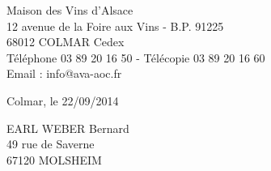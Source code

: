\documentclass[a4paper, 10pt]{letter}
\begin{document}
	\begin{minipage}{0.5\textwidth}
		\small{
		Maison des Vins d'Alsace \\
		12 avenue de la Foire aux Vins - B.P. 91225 \\
		68012 COLMAR Cedex \\
		Téléphone 03 89 20 16 50 - Télécopie 03 89 20 16 60 \\
		Email : info@ava-aoc.fr
		}
	\end{minipage}
	\begin{minipage}{0.5\textwidth}
		\begin{flushright}
		\vspace{-2mm}
		Colmar, le 22/09/2014
		\end{flushright}
		\begin{flushleft}
		\vspace{7mm}
		\hspace{1.8cm}EARL WEBER Bernard \\
		\hspace{1.8cm}49 rue de Saverne \\
		\vspace{2mm}
		\hspace{1.8cm}67120 MOLSHEIM
		\end{flushleft}
	\end{minipage}
	
\end{document}
